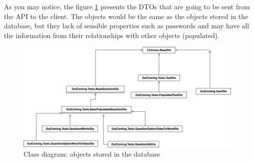             As you may notice, the figure \ref{fig:implementation_entities_db} presents the DTOs that are going to be sent from the API to the client. The objects would be
            the same as the objects stored in the database, but they lack of sensible properties such as passwords and may have all the information from their relationships
            with other objects (populated).
            \begin{figure}[H]
                \centering
                    \includegraphics[width=\textwidth]{assets/diagrams/outcoming_dto.png}
                \caption{Class diagram: objects stored in the database}
                \label{fig:implementation_entities_db}
            \end{figure}
        
            
        \newpage
